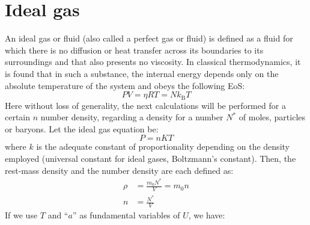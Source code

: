 \documentclass[12pt]{report}
\begin{document}
	\section{Ideal gas}
	An ideal gas or fluid (also called a perfect gas or fluid) is defined as a fluid for which there is no diffusion or heat transfer across its boundaries to its surroundings and that also presents no viscosity. In classical thermodynamics, it is found that in such a substance, the internal energy depends only on the absolute temperature of the system and obeys the following EoS:
	\begin{equation}
		PV = \eta RT = Nk_\text{B}T 
	\end{equation}
	Here without loss of generality, the next calculations will be performed for a certain $n$ number density, regarding a density for a number $N^*$ of moles, particles or baryons. Let the ideal gas equation be:
	\begin{equation}
		P= nKT \label{eq:idealgas}
	\end{equation}
	where $k$ is the adequate constant of proportionality depending on the density employed (universal constant for ideal gases, Boltzmann's constant). Then, the rest-mass density and the number density are each defined as:
	\begin{align}
		\rho &= \frac{m_0N^*}{V} = m_0n\\
		n&= \frac{N^*}{V} 
	\end{align}
	If we use $T$ and ``$a$'' as fundamental variables of $U$, we have:
	
\end{document}
